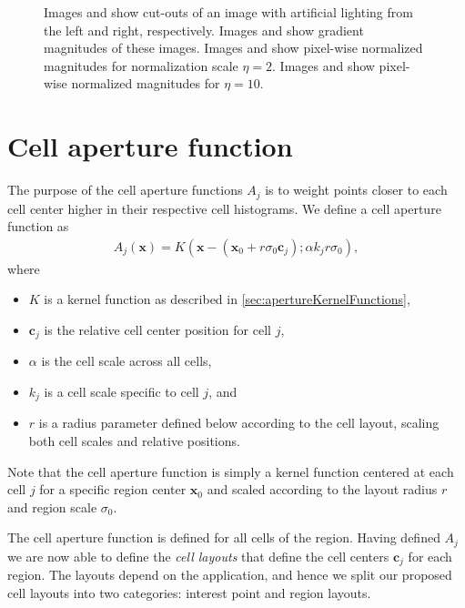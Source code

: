 \documentclass[thesis.tex]{subfiles}
\def\x{\mathbf{x}}
\def\c{\mathbf{c}}
\begin{document}
\begin{figure}[p]
\begin{subfigure}[t]{0.48\textwidth}
        \caption{}
        \label{fig:pixelNormalizationExample8}
    \end{subfigure}
    \caption{Images  and  show cut-outs of an image with artificial lighting from the left and right, respectively. Images  and  show gradient magnitudes of these images. Images  and  show pixel-wise normalized magnitudes for normalization scale $\eta = 2$. Images  and  show pixel-wise normalized magnitudes for $\eta = 10$.}
    \label{fig:pixelNormalizationExample}
\end{figure}
%
\section{Cell aperture function}
\label{sec:cellApertureFunction}
%
The purpose of the cell aperture functions $A_j$ is to weight points closer to each cell center higher in their respective cell histograms. We define a cell aperture function as
%
\begin{align}
A_j(\x) = K(\x - (\x_0 + r \sigma_0 \c_j); \alpha k_j r \sigma_0),
\end{align}
%
where
%
\begin{itemize}
\item[] $K$ is a kernel function as described in \ref{sec:apertureKernelFunctions},
\item[] $\c_j$ is the relative cell center position for cell $j$,
\item[] $\alpha$ is the cell scale across all cells,
\item[] $k_j$ is a cell scale specific to cell $j$, and
\item[] $r$ is a radius parameter defined below according to the cell layout, scaling both cell scales and relative positions.
\end{itemize}
%
Note that the cell aperture function is simply a kernel function centered at each cell $j$ for a specific region center $\x_0$ and scaled according to the layout radius $r$ and region scale $\sigma_0$.

The cell aperture function is defined for all cells of the region. Having defined $A_j$ we are now able to define the \emph{cell layouts} that define the cell centers $\c_j$ for each region. The layouts depend on the application, and hence we split our proposed cell layouts into two categories: interest point and region layouts. 
\end{document}
